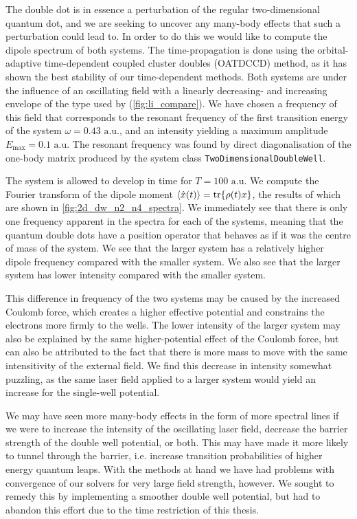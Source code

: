 The double dot is in essence a perturbation of the regular two-dimensional quantum dot,
and we are seeking to uncover any many-body 
effects that such a perturbation could lead to. In order to do this we would like to 
compute the dipole spectrum of both systems. The time-propagation is done using the 
orbital-adaptive time-dependent coupled cluster doubles (OATDCCD) method, as it has shown 
the best stability of our time-dependent methods. Both systems are under the influence of an 
oscillating field with a linearly decreasing- and increasing envelope of the type used by 
\citeauthor{li2005time} \cite{li2005time} (\autoref{fig:li_compare}). We have chosen a 
frequency of this field that corresponds to the resonant frequency of the first transition energy 
of the system $\omega = 0.43 \text{ a.u.}$, and an intensity yielding a maximum amplitude
$E_\text{max} = 0.1 \text{ a.u.}$ The resonant frequency was found by direct diagonalisation 
of the one-body matrix produced by the system class \lstinline{TwoDimensionalDoubleWell}.

The system is allowed to develop in time for $T = 100 \text{ a.u.}$ We compute the Fourier 
transform of the dipole moment $\ev{\hat{x}(t)} = \tr{\rho(t) x}$, the results of which are shown 
in \autoref{fig:2d_dw_n2_n4_spectra}. We immediately see that there is only one frequency 
apparent in the spectra for each of the systems, meaning that the quantum double dots
have a position operator that behaves as if it was the centre of mass of the system. We 
see that the larger system has a relatively higher dipole frequency 
compared with the smaller system. We also see that the larger system has lower intensity compared
with the smaller 
system.

This difference in frequency of the two systems may be caused by the increased Coulomb
force, which
creates a higher effective potential and constrains the electrons more firmly to the wells.
The lower intensity of the larger system may also be explained by the same higher-potential effect 
of the Coulomb force, but can also be attributed to the fact that there is more mass to move with 
the same intensitivity of the external field. We find this decrease in intensity somewhat puzzling,
as the same laser field applied to a larger system would yield an increase for the single-well 
potential.

We may have seen more many-body effects in the form of more spectral lines if we were to increase 
the intensity of the oscillating laser field, decrease the barrier strength of the double well potential,
or both. This may have made it more likely to tunnel through the barrier, i.e. increase transition 
probabilities of higher energy quantum leaps. With the methods at hand we have had problems with 
convergence of our solvers for very large field strength, however. We sought to remedy this by 
implementing a smoother double well potential, but had to abandon this effort due to the time 
restriction of this thesis.


